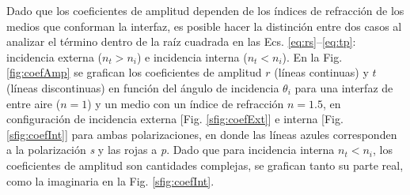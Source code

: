 Dado que los coeficientes  de amplitud dependen de los índices de refracción de los medios que conforman la interfaz, es posible hacer la distinción entre dos casos al analizar el término dentro de la raíz cuadrada en las Ecs. \eqref{eq:rs}--\eqref{eq:tp}: incidencia externa ($n_t>n_i$) e incidencia interna ($n_t<n_i$). En la Fig. \ref{fig:coefAmp} se grafican los coeficientes de amplitud $r$ (líneas continuas) y $t$ (líneas discontinuas) en función del ángulo de incidencia $\theta_i$ para una interfaz de entre aire ($n= 1$) y un medio con un índice de refracción $n = 1.5$, en configuración de incidencia externa [Fig. \ref{sfig:coefExt}] e interna [Fig. \ref{sfig:coefInt}] para ambas polarizaciones, en donde las líneas azules corresponden a la polarización \emph{s} y las rojas a \emph{p}. Dado que para incidencia interna $n_t<n_i$, los coeficientes de amplitud son cantidades complejas, se grafican tanto su parte real, como la imaginaria en la Fig. \ref{sfig:coefInt}.
%
